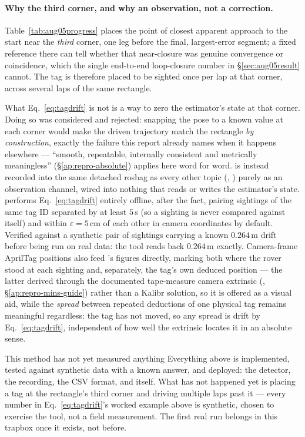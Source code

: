 \paragraph{Why the third corner, and why an observation, not a correction.}
Table~\ref{tab:aug05progress} places the point of closest apparent approach
to the start near the \emph{third} corner, one leg before the final,
largest-error segment; a fixed reference there can tell whether that
near-closure was genuine convergence or coincidence, which the single
end-to-end loop-closure number in \S\ref{sec:aug05result} cannot. The tag is
therefore placed to be sighted once per lap at that corner, across several
laps of the same rectangle.

What Eq.~\ref{eq:tagdrift} is not is a way to zero the estimator's state at
that corner. Doing so was considered and rejected: snapping the pose to a
known value at each corner would make the driven trajectory match the
rectangle \emph{by construction}, exactly the failure this report already
names when it happens elsewhere --- ``smooth, repeatable, internally
consistent and metrically meaningless'' (\S\ref{ap:repro-absolute}) applies
here word for word.  is instead recorded into the same
detached rosbag as every other topic
(, ) purely as an observation
channel, wired into nothing that reads or writes the estimator's state.
 performs Eq.~\ref{eq:tagdrift} entirely offline,
after the fact, pairing sightings of the same tag ID separated by at least
$5$\,s (so a sighting is never compared against itself) and within
$\varepsilon=5$\,cm of each other in camera coordinates by default. Verified
against a synthetic pair of sightings carrying a known $0.264$\,m drift
before being run on real data: the tool reads back $0.264$\,m exactly.
Camera-frame AprilTag positions also feed
's figures directly, marking both where the
rover stood at each sighting and, separately, the tag's own deduced position
--- the latter derived through the documented tape-measure camera extrinsic
(, \S\ref{ap:repro-mins-guide}) rather than a Kalibr
solution, so it is offered as
a visual aid, while the \emph{spread} between repeated deductions of one
physical tag remains meaningful regardless: the tag has not moved, so any
spread is drift by Eq.~\ref{eq:tagdrift}, independent of how well the
extrinsic locates it in an absolute sense.

\begin{trapbox}{This method has not yet measured anything}
Everything above is implemented, tested against synthetic data with a known
answer, and deployed: the detector, the recording, the CSV format, and
 itself. What has not happened yet is placing a tag at
the rectangle's third corner and driving multiple laps past it --- every
number in Eq.~\ref{eq:tagdrift}'s worked example above is synthetic, chosen
to exercise the tool, not a field measurement. The first real run belongs in
this trapbox once it exists, not before.
\end{trapbox}

